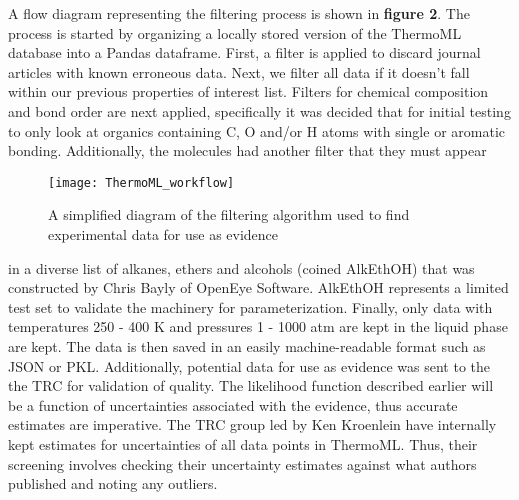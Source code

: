 \documentclass[rmp,nofootinbib,superscriptaddress,12pt,tightenlines,notitlepage]{revtex4-1}
\begin{document}
A flow diagram representing the filtering process is shown in \textbf{figure 2}. The process is started by organizing a locally stored version of the 
ThermoML database into a Pandas dataframe. First, a filter is applied to discard journal articles with known erroneous data. Next, we filter all data if it doesn't 
fall within our previous properties of interest list. Filters for chemical composition and bond order are next applied, specifically it was decided that for initial 
testing to only look at organics containing C, O and/or H atoms with single or aromatic bonding. Additionally, the molecules had another filter that they must appear
\begin{wrapfigure}{r}{0.5\textwidth}
 \centering
 \texttt{[image: ThermoML\_workflow]}
 \caption{A simplified diagram of the filtering algorithm used to find experimental data for use as evidence}
\end{wrapfigure}
in a diverse list of alkanes, ethers and alcohols (coined AlkEthOH) that was constructed by Chris Bayly of OpenEye Software. AlkEthOH represents a limited test set 
to validate the machinery for parameterization. Finally, only data with temperatures  
250 - 400 K and pressures 1 - 1000 atm are kept in the liquid phase are kept. The data is then saved in an easily machine-readable format such as JSON or PKL. Additionally, potential data 
for use as evidence was sent to the the TRC for validation of quality. The likelihood function described earlier will be a function of uncertainties associated
with the evidence, thus accurate estimates are imperative. The TRC group led by Ken Kroenlein have internally kept estimates for uncertainties of all data points
in ThermoML. Thus, their screening involves checking their uncertainty estimates against what authors published and noting any outliers. 
\end{document}
